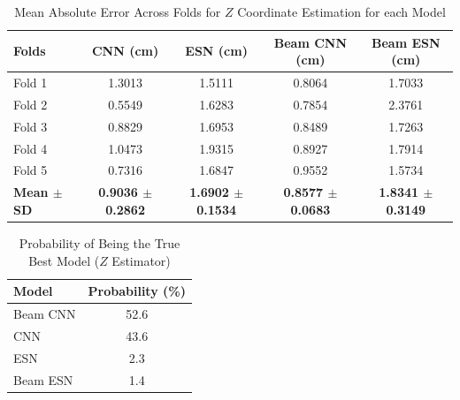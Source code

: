 \begin{table}[H]
  \centering
  \caption{Mean Absolute Error Across Folds for $Z$ Coordinate Estimation for each Model}
  \label{tab:mae_z_models_comparison}
  \vspace{0.25cm}
  \footnotesize
  \begin{tabular}{lcccc}
    \toprule
    \textbf{Folds} & \textbf{CNN (cm)} & \textbf{ESN (cm)} & \textbf{Beam CNN (cm)} & \textbf{Beam ESN (cm)} \\
    \midrule
    Fold 1 & 1.3013 & 1.5111 & 0.8064 & 1.7033 \\
    Fold 2 & 0.5549 & 1.6283 & 0.7854 & 2.3761 \\
    Fold 3 & 0.8829 & 1.6953 & 0.8489 & 1.7263 \\
    Fold 4 & 1.0473 & 1.9315 & 0.8927 & 1.7914 \\
    Fold 5 & 0.7316 & 1.6847 & 0.9552 & 1.5734 \\
    \midrule
    \textbf{Mean $\pm$ SD} & \textbf{0.9036 $\pm$ 0.2862} & \textbf{1.6902 $\pm$ 0.1534} & \textbf{0.8577 $\pm$ 0.0683} & \textbf{1.8341 $\pm$ 0.3149} \\
    \bottomrule
  \end{tabular}
\end{table}


\begin{table}[H]
  \centering
  \caption{Probability of Being the True Best Model ($Z$ Estimator)}
  \label{tab:best_model_probability_z}
  \vspace{0.25cm}
  \begin{tabular}{lc}
    \toprule
    \textbf{Model} & \textbf{Probability (\%)} \\
    \midrule
    Beam CNN & 52.6 \\
    CNN      & 43.6 \\
    ESN      & 2.3  \\
    Beam ESN & 1.4  \\
    \bottomrule
  \end{tabular}
\end{table}
